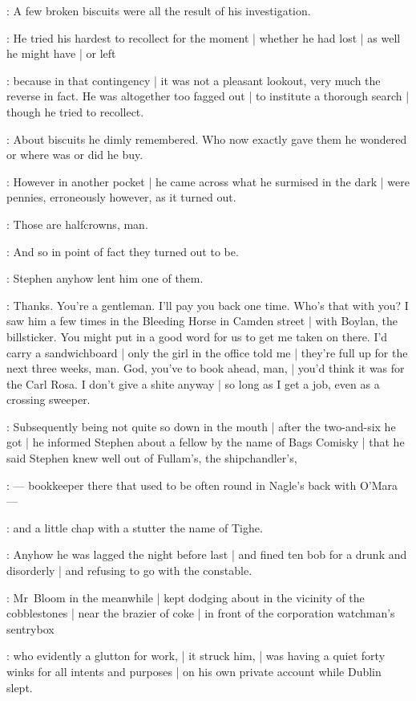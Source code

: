 :
A few broken biscuits were all the result of his investigation.

:
He tried his hardest to recollect for the moment |
whether he had lost |
as well he might have |
or left

:
because in that contingency |
it was not a pleasant lookout, very much the reverse in fact.
He was altogether too fagged out |
to institute a thorough search |
though he tried to recollect.

:
About biscuits he dimly remembered.
Who now exactly gave them he wondered or where was or did he buy.

:
However in another pocket |
he came across what he surmised in the dark |
were pennies, erroneously however, as it turned out.

\LordJohnCorley:
Those are halfcrowns, man.

:
And so in point of fact they turned out to be.

:
Stephen anyhow lent him one of them.

\LordJohnCorley:
Thanks.
You're a gentleman.
I'll pay you back one time.
Who's that with you?
I saw him a few times in the Bleeding Horse in Camden street |
with Boylan, the billsticker.
You might put in a good word for us to get me taken on there.
I'd carry a sandwichboard |
only the girl in the office told me |
they're full up for the next three weeks, man.
God, you've to book ahead, man, |
you'd think it was for the Carl Rosa.
I don't give a shite anyway |
so long as I get a job, even as a crossing sweeper.

:
Subsequently being not quite so down in the mouth |
after the two-and-six he got |
he informed Stephen about a fellow by the name of Bags Comisky |
that he said Stephen knew well out of Fullam's, the shipchandler's,

:
    --- bookkeeper there that used to be often round in Nagle's back with O'Mara ---

:
and a little chap with a stutter the name of Tighe.

:
Anyhow he was lagged the night before last |
and fined ten bob for a drunk and disorderly |
and refusing to go with the constable.

:
Mr~Bloom in the meanwhile |
kept dodging about in the vicinity of the cobblestones |
near the brazier of coke |
in front of the corporation watchman's sentrybox

:
who evidently a glutton for work, |
it struck him, |
was having a quiet forty winks for all intents and purposes |
on his own private account while Dublin slept.

